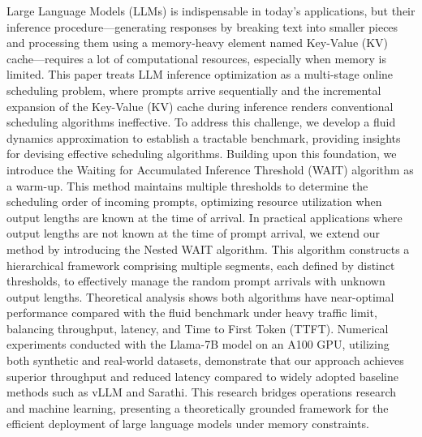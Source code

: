 Large Language Models (LLMs) is indispensable in today's applications, but their inference procedure—generating responses by breaking text into smaller pieces and processing them using a memory-heavy element named Key-Value (KV) cache—requires a lot of computational resources, especially when memory is limited. This paper treats LLM inference optimization as a multi-stage online scheduling problem, where prompts arrive sequentially and the incremental expansion of the Key-Value (KV) cache during inference renders conventional scheduling algorithms ineffective. To address this challenge, we develop a fluid dynamics approximation to establish a tractable benchmark, providing insights for devising effective scheduling algorithms. Building upon this foundation, we introduce the Waiting for Accumulated Inference Threshold (WAIT) algorithm as a warm-up. This method maintains multiple thresholds to determine the scheduling order of incoming prompts, optimizing resource utilization when output lengths are known at the time of arrival. In practical applications where output lengths are not known at the time of prompt arrival, we extend our method by introducing the Nested WAIT algorithm. This algorithm constructs a hierarchical framework comprising multiple segments, each defined by distinct thresholds, to effectively manage the random prompt arrivals with unknown output lengths. Theoretical analysis shows both algorithms have near-optimal performance compared with the fluid benchmark under heavy traffic limit, balancing throughput, latency, and Time to First Token (TTFT). Numerical experiments conducted with the Llama-7B model on an A100 GPU, utilizing both synthetic and real-world datasets, demonstrate that our approach achieves superior throughput and reduced latency compared to widely adopted baseline methods such as vLLM and Sarathi. This research bridges operations research and machine learning, presenting a theoretically grounded framework for the efficient deployment of large language models under memory constraints.